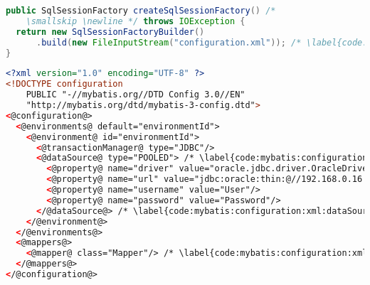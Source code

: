 
\begin{lstlisting}[language=Java, belowskip=-2mm]
public SqlSessionFactory createSqlSessionFactory() /*
    \smallskip \newline */ throws IOException {
  return new SqlSessionFactoryBuilder()
      .build(new FileInputStream("configuration.xml")); /* \label{code:mybatis:sessionFactory:xml:file} */
}
\end{lstlisting}

\begin{lstlisting}[language=XML, caption={Configuration of \Code{SqlSessionFactory} using external XML configuration file}, label={code:mybatis:sessionFactory:xml}]
<?xml version="1.0" encoding="UTF-8" ?>
<!DOCTYPE configuration
    PUBLIC "-//mybatis.org//DTD Config 3.0//EN"
    "http://mybatis.org/dtd/mybatis-3-config.dtd">
<@configuration@>
  <@environments@ default="environmentId">
    <@environment@ id="environmentId">
      <@transactionManager@ type="JDBC"/>
      <@dataSource@ type="POOLED"> /* \label{code:mybatis:configuration:xml:dataSource:begin} */
        <@property@ name="driver" value="oracle.jdbc.driver.OracleDriver"/>
        <@property@ name="url" value="jdbc:oracle:thin:@//192.168.0.16:1521/orcl"/>
        <@property@ name="username" value="User"/>
        <@property@ name="password" value="Password"/>
      </@dataSource@> /* \label{code:mybatis:configuration:xml:dataSource:end} */
    </@environment@>
  </@environments@>
  <@mappers@>
    <@mapper@ class="Mapper"/> /* \label{code:mybatis:configuration:xml:mapper} */
  </@mappers@>
</@configuration@>
\end{lstlisting}
